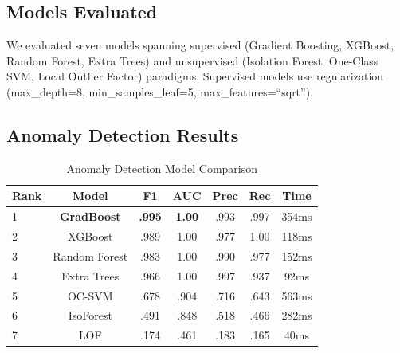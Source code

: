 \documentclass[conference]{IEEEtran}
\begin{document}
\subsection{Models Evaluated}
We evaluated seven models spanning supervised (Gradient Boosting, XGBoost, Random Forest, Extra Trees) and unsupervised (Isolation Forest, One-Class SVM, Local Outlier Factor) paradigms. Supervised models use regularization (max\_depth=8, min\_samples\_leaf=5, max\_features=``sqrt'').

\subsection{Anomaly Detection Results}

\begin{table}[H]
\centering
\caption{Anomaly Detection Model Comparison}
\label{tab:anomaly_results}
\begin{tabular}{lcccccc}
\toprule
\textbf{Rank} & \textbf{Model} & \textbf{F1} & \textbf{AUC} & \textbf{Prec} & \textbf{Rec} & \textbf{Time} \\
\midrule
1 & \textbf{GradBoost} & \textbf{.995} & \textbf{1.00} & .993 & .997 & 354ms \\
2 & XGBoost & .989 & 1.00 & .977 & 1.00 & 118ms \\
3 & Random Forest & .983 & 1.00 & .990 & .977 & 152ms \\
4 & Extra Trees & .966 & 1.00 & .997 & .937 & 92ms \\
5 & OC-SVM & .678 & .904 & .716 & .643 & 563ms \\
6 & IsoForest & .491 & .848 & .518 & .466 & 282ms \\
7 & LOF & .174 & .461 & .183 & .165 & 40ms \\
\bottomrule
\end{tabular}
\end{table}
\end{document}
